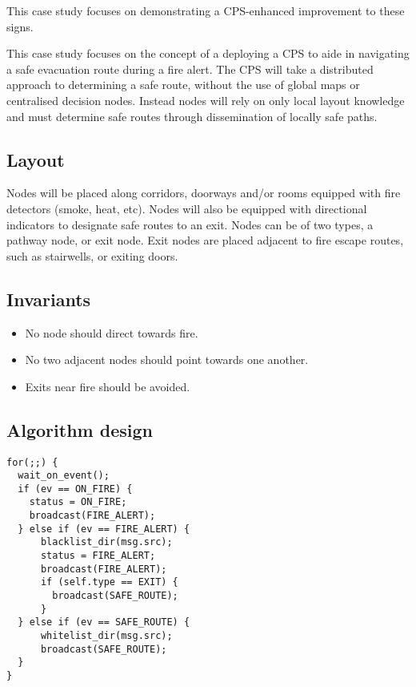 This case study focuses on demonstrating a CPS-enhanced improvement to these signs.


This case study focuses on the concept of a deploying a CPS to aide in navigating a safe evacuation route during a fire alert. The CPS will take a distributed approach to determining a safe route, without the use of global maps or centralised decision nodes. Instead nodes will rely on only local layout knowledge and must determine safe routes through dissemination of locally safe paths.

\subsection{Layout}
Nodes will be placed along corridors, doorways and/or rooms equipped with fire detectors (smoke, heat, etc). Nodes will also be equipped with directional indicators to designate safe routes to an exit. Nodes can be of two types, a pathway node, or exit node. Exit nodes are placed adjacent to fire escape routes, such as stairwells, or exiting doors.

\subsection{Invariants}
\begin{itemize}
  \item No node should direct towards fire.
  \item No two adjacent nodes should point towards one another.
  \item Exits near fire should be avoided.
\end{itemize}

\subsection{Algorithm design}
\begin{verbatim}
for(;;) {
  wait_on_event();
  if (ev == ON_FIRE) {
    status = ON_FIRE;
    broadcast(FIRE_ALERT);
  } else if (ev == FIRE_ALERT) {
      blacklist_dir(msg.src);
      status = FIRE_ALERT;
      broadcast(FIRE_ALERT);
      if (self.type == EXIT) {
        broadcast(SAFE_ROUTE);
      }
  } else if (ev == SAFE_ROUTE) {
      whitelist_dir(msg.src);
      broadcast(SAFE_ROUTE);
  }
}
\end{verbatim}
